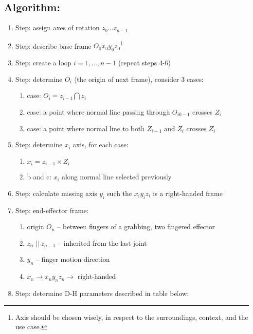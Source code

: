 \documentclass[12pt, a4paper]{extarticle}
\begin{document}
	\subsection{Algorithm:}
	\begin{enumerate}
		\setlength\itemsep{-0.3em}
		\item Step: assign axes of rotation $z_0 \dots z_{n-1}$
		\item Step: describe base frame $O_0 x_0 y_0 z_0$\footnote{Axis should be chosen wisely, in respect to the surroundings, context, and the use case.}
		\item Step: create a loop $i=1, \dots, n-1$ (repeat steps 4-6)
		\item Step: determine $O_i$ (the origin of next frame), consider 3 cases:
		\begin{enumerate}
			\item case: $O_i = z_{i-1}  \bigcap z_i$
			\item case: a point where normal line passing through $O_{i0-1}$ crosses $Z_i$
			\item case: a point where normal line to both $Z_{i-1}$ and $Z_i$ crosses $Z_i$
		\end{enumerate}
		\item Step: determine $x_i$ axis, for each case:
		\begin{enumerate}
			\item $x_i = z_{i-1} \times Z_i$
			\item b and c: $x_i$ along normal line selected previously
		\end{enumerate}
		\item Step: calculate missing axis $y_i$ such the $x_i y_i z_i$ is a right-handed frame
		\item Step: end-effector frame:
		\begin{enumerate}
			\item origin $O_n$ -- between fingers of a grabbing, two fingered effector
			\item $z_n \; || \; z_{n-1}$ -- inherited from the last joint
			\item $y_n$ -- finger motion direction
			\item $x_n \rightarrow x_n y_n z_n \rightarrow $ right-handed
		\end{enumerate}
		\item Step: determine D-H parameters described in table below:


\end{enumerate}
\end{document}
